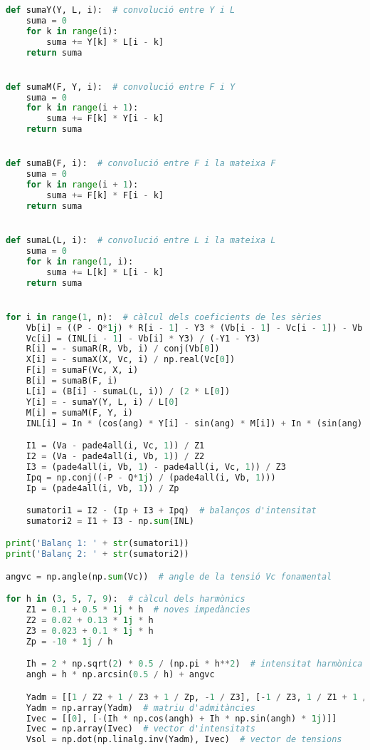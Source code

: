 \begin{lstlisting}[language=Python,numbers=none]
def sumaY(Y, L, i):  # convolució entre Y i L
    suma = 0
    for k in range(i):
        suma += Y[k] * L[i - k]
    return suma


def sumaM(F, Y, i):  # convolució entre F i Y
    suma = 0
    for k in range(i + 1):
        suma += F[k] * Y[i - k]
    return suma


def sumaB(F, i):  # convolució entre F i la mateixa F
    suma = 0
    for k in range(i + 1):
        suma += F[k] * F[i - k]
    return suma


def sumaL(L, i):  # convolució entre L i la mateixa L
    suma = 0
    for k in range(1, i):
        suma += L[k] * L[i - k]
    return suma


for i in range(1, n):  # càlcul dels coeficients de les sèries
    Vb[i] = ((P - Q*1j) * R[i - 1] - Y3 * (Vb[i - 1] - Vc[i - 1]) - Vb[i - 1] * Yp) / Y2
    Vc[i] = (INL[i - 1] - Vb[i] * Y3) / (-Y1 - Y3)
    R[i] = - sumaR(R, Vb, i) / conj(Vb[0])
    X[i] = - sumaX(X, Vc, i) / np.real(Vc[0])
    F[i] = sumaF(Vc, X, i)
    B[i] = sumaB(F, i)
    L[i] = (B[i] - sumaL(L, i)) / (2 * L[0])
    Y[i] = - sumaY(Y, L, i) / L[0]
    M[i] = sumaM(F, Y, i)
    INL[i] = In * (cos(ang) * Y[i] - sin(ang) * M[i]) + In * (sin(ang) * Y[i] + cos(ang) * M[i]) * 1j

    I1 = (Va - pade4all(i, Vc, 1)) / Z1
    I2 = (Va - pade4all(i, Vb, 1)) / Z2
    I3 = (pade4all(i, Vb, 1) - pade4all(i, Vc, 1)) / Z3
    Ipq = np.conj((-P - Q*1j) / (pade4all(i, Vb, 1)))
    Ip = (pade4all(i, Vb, 1)) / Zp

    sumatori1 = I2 - (Ip + I3 + Ipq)  # balanços d'intensitat
    sumatori2 = I1 + I3 - np.sum(INL)

print('Balanç 1: ' + str(sumatori1))
print('Balanç 2: ' + str(sumatori2))

angvc = np.angle(np.sum(Vc))  # angle de la tensió Vc fonamental

for h in (3, 5, 7, 9):  # càlcul dels harmònics
    Z1 = 0.1 + 0.5 * 1j * h  # noves impedàncies
    Z2 = 0.02 + 0.13 * 1j * h
    Z3 = 0.023 + 0.1 * 1j * h
    Zp = -10 * 1j / h

    Ih = 2 * np.sqrt(2) * 0.5 / (np.pi * h**2)  # intensitat harmònica de la làmpada
    angh = h * np.arcsin(0.5 / h) + angvc

    Yadm = [[1 / Z2 + 1 / Z3 + 1 / Zp, -1 / Z3], [-1 / Z3, 1 / Z1 + 1 / Z3]]
    Yadm = np.array(Yadm)  # matriu d'admitàncies
    Ivec = [[0], [-(Ih * np.cos(angh) + Ih * np.sin(angh) * 1j)]]
    Ivec = np.array(Ivec)  # vector d'intensitats
    Vsol = np.dot(np.linalg.inv(Yadm), Ivec)  # vector de tensions
\end{lstlisting}


